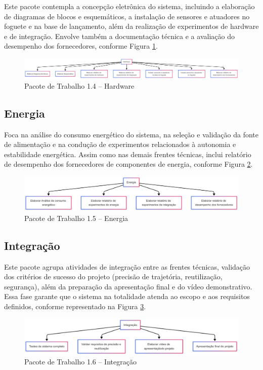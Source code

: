 Este pacote contempla a concepção eletrônica do sistema, incluindo a elaboração de diagramas de blocos e esquemáticos, a instalação de sensores e atuadores no foguete e na base de lançamento, além da realização de experimentos de hardware e de integração. Envolve também a documentação técnica e a avaliação do desempenho dos fornecedores, conforme Figura \ref{fig_eap_hardware}.


\begin{figure}[!h]
	\centering
\includegraphics[width=15cm]{figuras/eap_hardware.png}
	\caption{Pacote de Trabalho 1.4 – Hardware}
	\label{fig_eap_hardware} 
\end{figure}

\subsection{Energia}

Foca na análise do consumo energético do sistema, na seleção e validação da fonte de alimentação e na condução de experimentos relacionados à autonomia e estabilidade energética. Assim como nas demais frentes técnicas, inclui relatório de desempenho dos fornecedores de componentes de energia, conforme Figura \ref{fig_eap_energia}.

\begin{figure}[!h]
	\centering
\includegraphics[width=15cm]{figuras/eap_energia.png}
	\caption{Pacote de Trabalho 1.5 – Energia}
	\label{fig_eap_energia} 
\end{figure}

\newpage

\subsection{Integração}


Este pacote agrupa atividades de integração entre as frentes técnicas, validação dos critérios de sucesso do projeto (precisão de trajetória, reutilização, segurança), além da preparação da apresentação final e do vídeo demonstrativo. Essa fase garante que o sistema na totalidade atenda ao escopo e aos requisitos definidos, conforme representado na Figura \ref{fig_eap_integracao}.

\begin{figure}[!h]
	\centering
\includegraphics[width=15cm]{figuras/eap_integracao.png}
	\caption{Pacote de Trabalho 1.6 – Integração}
	\label{fig_eap_integracao}  
\end{figure}
